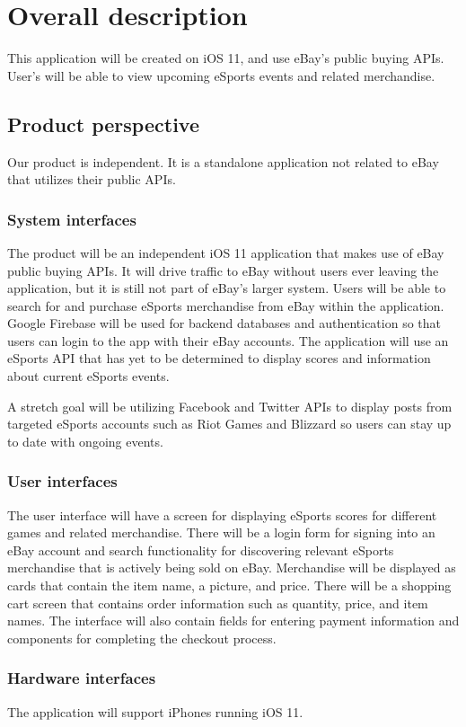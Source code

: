 \documentclass[onecolumn, draftclsnofoot,10pt, compsoc]{IEEEtran}
\begin{document}
\section{Overall description}
This application will be created on iOS 11, and use eBay's public buying APIs. User's will be able to view upcoming eSports events and related merchandise.

\subsection{Product perspective}
Our product is independent. It is a standalone application not related to eBay that utilizes their public APIs.

\subsubsection{System interfaces}
The product will be an independent iOS 11 application that makes use of eBay public buying APIs. 
It will drive traffic to eBay without users ever leaving the application, but it is still not part of eBay’s larger system. 
Users will be able to search for and purchase eSports merchandise from eBay within the application. 
Google Firebase will be used for backend databases and authentication so that users can login to the app with their eBay accounts. 
The application will use an eSports API that has yet to be determined to display scores and information about current eSports events.  

A stretch goal will be utilizing Facebook and Twitter APIs to display posts from targeted eSports accounts such as Riot Games and Blizzard so users can stay up to date with ongoing events. 
\subsubsection{User interfaces}
The user interface will have a screen for displaying eSports scores for different games and related merchandise. 
There will be a login form for signing into an eBay account and search functionality for discovering relevant eSports merchandise that is actively being sold on eBay. 
Merchandise will be displayed as cards that contain the item name, a picture, and price. 
There will be a shopping cart screen that contains order information such as quantity, price, and item names. 
The interface will also contain fields for entering payment information and components for completing the checkout process. 

\subsubsection{Hardware interfaces}
The application will support iPhones running iOS 11. 
\end{document}
